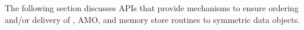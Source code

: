 The following section discusses \openshmem \ac{API}s that provide mechanisms to ensure ordering and/or delivery of , \ac{AMO}, and memory store routines to symmetric data 
objects. 